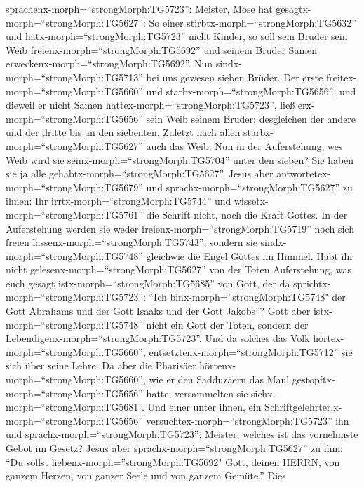 sprachenx-morph=``strongMorph:TG5723'': Meister, Mose hat
gesagtx-morph=``strongMorph:TG5627'': So einer
stirbtx-morph=``strongMorph:TG5632'' und
hatx-morph=``strongMorph:TG5723'' nicht Kinder, so soll sein Bruder sein
Weib freienx-morph=``strongMorph:TG5692'' und seinem Bruder Samen
erweckenx-morph=``strongMorph:TG5692''.  Nun
sindx-morph=``strongMorph:TG5713'' bei uns gewesen sieben Brüder. Der
erste freitex-morph=``strongMorph:TG5660'' und
starbx-morph=``strongMorph:TG5656''; und dieweil er nicht Samen
hattex-morph=``strongMorph:TG5723'', ließ
erx-morph=``strongMorph:TG5656'' sein Weib seinem Bruder; 
desgleichen der andere und der dritte bis an den siebenten.
 Zuletzt nach allen starbx-morph=``strongMorph:TG5627''
auch das Weib.  Nun in der Auferstehung, wes Weib wird sie
seinx-morph=``strongMorph:TG5704'' unter den sieben? Sie haben sie ja
alle gehabtx-morph=``strongMorph:TG5627''.  Jesus aber
antwortetex-morph=``strongMorph:TG5679'' und
sprachx-morph=``strongMorph:TG5627'' zu ihnen: Ihr
irrtx-morph=``strongMorph:TG5744'' und
wissetx-morph=``strongMorph:TG5761'' die Schrift nicht, noch die Kraft
Gottes.  In der Auferstehung werden sie weder
freienx-morph=``strongMorph:TG5719'' noch sich freien
lassenx-morph=``strongMorph:TG5743'', sondern sie
sindx-morph=``strongMorph:TG5748'' gleichwie die Engel Gottes im Himmel.
 Habt ihr nicht gelesenx-morph=``strongMorph:TG5627'' von
der Toten Auferstehung, was euch gesagt
istx-morph=``strongMorph:TG5685'' von Gott, der da
sprichtx-morph=``strongMorph:TG5723'':  ``Ich
binx-morph=''strongMorph:TG5748" der Gott Abrahams und der Gott Isaaks
und der Gott Jakobs''? Gott aber istx-morph=``strongMorph:TG5748'' nicht
ein Gott der Toten, sondern der
Lebendigenx-morph=``strongMorph:TG5723''.  Und da solches
das Volk hörtex-morph=``strongMorph:TG5660'',
entsetztenx-morph=``strongMorph:TG5712'' sie sich über seine Lehre.
 Da aber die Pharisäer
hörtenx-morph=``strongMorph:TG5660'', wie er den Sadduzäern das Maul
gestopftx-morph=``strongMorph:TG5656'' hatte, versammelten sie
sichx-morph=``strongMorph:TG5681''.  Und einer unter ihnen,
ein Schriftgelehrter,x-morph=``strongMorph:TG5656''
versuchtex-morph=``strongMorph:TG5723'' ihn und
sprachx-morph=``strongMorph:TG5723'':  Meister, welches ist
das vornehmste Gebot im Gesetz?  Jesus aber
sprachx-morph=``strongMorph:TG5627'' zu ihm: ``Du sollst
liebenx-morph=''strongMorph:TG5692" Gott, deinen HERRN, von ganzem
Herzen, von ganzer Seele und von ganzem Gemüte.''  Dies
